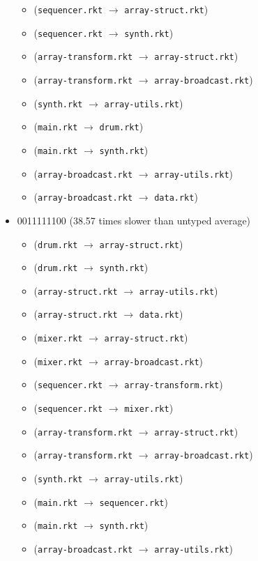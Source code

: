 \documentclass{article}
\newcommand{\mono}[1]{\texttt{#1}}
\begin{document}
\begin{itemize}
\begin{itemize}
  \item (\mono{sequencer.rkt} $\rightarrow$ \mono{array-struct.rkt})
  \item (\mono{sequencer.rkt} $\rightarrow$ \mono{synth.rkt})
  \item (\mono{array-transform.rkt} $\rightarrow$ \mono{array-struct.rkt})
  \item (\mono{array-transform.rkt} $\rightarrow$ \mono{array-broadcast.rkt})
  \item (\mono{synth.rkt} $\rightarrow$ \mono{array-utils.rkt})
  \item (\mono{main.rkt} $\rightarrow$ \mono{drum.rkt})
  \item (\mono{main.rkt} $\rightarrow$ \mono{synth.rkt})
  \item (\mono{array-broadcast.rkt} $\rightarrow$ \mono{array-utils.rkt})
  \item (\mono{array-broadcast.rkt} $\rightarrow$ \mono{data.rkt})
  \end{itemize}
\item 0011111100 (38.57 times slower than untyped average)
  \begin{itemize}
  \item (\mono{drum.rkt} $\rightarrow$ \mono{array-struct.rkt})
  \item (\mono{drum.rkt} $\rightarrow$ \mono{synth.rkt})
  \item (\mono{array-struct.rkt} $\rightarrow$ \mono{array-utils.rkt})
  \item (\mono{array-struct.rkt} $\rightarrow$ \mono{data.rkt})
  \item (\mono{mixer.rkt} $\rightarrow$ \mono{array-struct.rkt})
  \item (\mono{mixer.rkt} $\rightarrow$ \mono{array-broadcast.rkt})
  \item (\mono{sequencer.rkt} $\rightarrow$ \mono{array-transform.rkt})
  \item (\mono{sequencer.rkt} $\rightarrow$ \mono{mixer.rkt})
  \item (\mono{array-transform.rkt} $\rightarrow$ \mono{array-struct.rkt})
  \item (\mono{array-transform.rkt} $\rightarrow$ \mono{array-broadcast.rkt})
  \item (\mono{synth.rkt} $\rightarrow$ \mono{array-utils.rkt})
  \item (\mono{main.rkt} $\rightarrow$ \mono{sequencer.rkt})
  \item (\mono{main.rkt} $\rightarrow$ \mono{synth.rkt})
  \item (\mono{array-broadcast.rkt} $\rightarrow$ \mono{array-utils.rkt})

\end{itemize}
\end{itemize}
\end{document}
